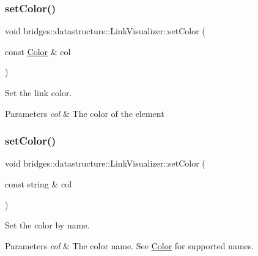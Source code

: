 \subsubsection{\texorpdfstring{set\+Color()}{setColor()}\hspace{0.1cm}{\footnotesize\ttfamily [1/2]}}
{\footnotesize\ttfamily void bridges\+::datastructure\+::\+Link\+Visualizer\+::set\+Color (\begin{DoxyParamCaption}\item[{const \hyperlink{classbridges_1_1datastructure_1_1_color}{Color} \&}]{col }\end{DoxyParamCaption})\hspace{0.3cm}{\ttfamily [inline]}}



Set the link color. 


\begin{DoxyParams}{Parameters}
{\em col} & The color of the element \\
\hline
\end{DoxyParams}
\mbox{\label{classbridges_1_1datastructure_1_1_link_visualizer_af570ade2d50a8789db3b06b79e5dc589}} 
\subsubsection{\texorpdfstring{set\+Color()}{setColor()}\hspace{0.1cm}{\footnotesize\ttfamily [2/2]}}
{\footnotesize\ttfamily void bridges\+::datastructure\+::\+Link\+Visualizer\+::set\+Color (\begin{DoxyParamCaption}\item[{const string \&}]{col }\end{DoxyParamCaption})\hspace{0.3cm}{\ttfamily [inline]}}



Set the color by name. 


\begin{DoxyParams}{Parameters}
{\em col} & The color name. See \hyperlink{classbridges_1_1datastructure_1_1_color}{Color} for supported names. \\
\hline
\end{DoxyParams}
\mbox{\label{classbridges_1_1datastructure_1_1_link_visualizer_a20ed50bf0e02f79dda0cb54c3af722fe}} 
